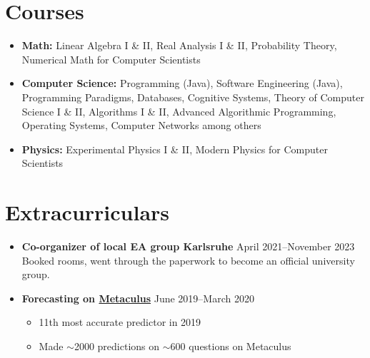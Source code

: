 \documentclass[letterpaper,10pt]{article}
\begin{document}
\section*{Courses}
\begin{itemize}
    \item \textbf{Math:} Linear Algebra I \& II, Real Analysis I \& II, Probability Theory, Numerical Math for Computer Scientists
    \item \textbf{Computer Science:} Programming (Java), Software Engineering (Java), Programming Paradigms, Databases, Cognitive Systems, Theory of Computer Science I \& II, Algorithms I \& II, Advanced Algorithmic Programming, Operating Systems, Computer Networks among others
    \item \textbf{Physics:} Experimental Physics I \& II, Modern Physics for Computer Scientists
\end{itemize}


\unless\ifdefined\EAVersion
\section*{Extracurriculars}
  \begin{itemize}
      \item {\textbf{Co-organizer of local EA group Karlsruhe}} \hfill April 2021--November 2023 \\
      {Booked rooms, went through the paperwork to become an official university group.}
      \item \textbf{Forecasting on \href{https://www.metaculus.com/accounts/profile/106992/}{Metaculus}} \hfill June 2019--March 2020
      \begin{itemize}
              \item 11th most accurate predictor in 2019
              \item Made $\sim$2000 predictions on $\sim$600 questions on Metaculus
      \end{itemize}
  \end{itemize}
\end{document}
